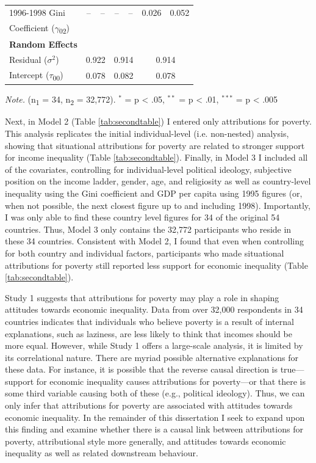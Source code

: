 \documentclass{sfuthesis}
\begin{document}
\begin{table}[h]
\begin{center}
\begin{tabular}{l c c c c c c}
      1996-1998 Gini & -- & -- & -- & -- & \multicolumn{1}{S}{0.026} & \multicolumn{1}{S}{0.052}\\
      Coefficient ($\gamma$\textsubscript{02})\\
      \textbf{Random Effects}\\
      Residual ($\sigma^2$) & \multicolumn{2}{S}{0.922} & \multicolumn{2}{S}{0.914} & \multicolumn{2}{S}{0.914}\\
      Intercept ($\tau$\textsubscript{00}) & \multicolumn{2}{S}{0.078} & \multicolumn{2}{S}{0.082} & \multicolumn{2}{S}{0.078}\\
      \hline
    \end{tabular}
  \end{center}
  \textit{Note.} (n\textsubscript{1} = 34, n\textsubscript{2} = 32,772). $^*$ = p < .05, $^{**}$ = p < .01, $^{***}$ = p < .005
\end{table}

Next, in Model 2 (Table \ref{tab:secondtable}) I entered only attributions for poverty. This analysis replicates the initial individual-level (i.e. non-nested) analysis, showing that situational attributions for poverty are related to stronger support for income inequality (Table \ref{tab:secondtable}). Finally, in Model 3 I included all of the covariates, controlling for individual-level political ideology, subjective position on the income ladder, gender, age, and religiosity as well as country-level inequality using the Gini coefficient and GDP per capita using 1995 figures (or, when not possible, the next closest figure up to and including 1998). Importantly, I was only able to find these country level figures for 34 of the original 54 countries. Thus, Model 3 only contains the 32,772 participants who reside in these 34 countries. Consistent with Model 2, I found that even when controlling for both country and individual factors, participants who made situational attributions for poverty still reported less support for economic inequality (Table \ref{tab:secondtable}).

Study 1 suggests that attributions for poverty may play a role in shaping attitudes towards economic inequality. Data from over 32,000 respondents in 34 countries indicates that individuals who believe poverty is a result of internal explanations, such as laziness, are less likely to think that incomes should be more equal. However, while Study 1 offers a large-scale analysis, it is limited by its correlational nature. There are myriad possible alternative explanations for these data. For instance, it is possible that the reverse causal direction is true—support for economic inequality causes attributions for poverty—or that there is some third variable causing both of these (e.g., political ideology). Thus, we can only infer that attributions for poverty are associated with attitudes towards economic inequality. In the remainder of this dissertation I seek to expand upon this finding and examine whether there is a causal link between attributions for poverty, attributional style more generally, and attitudes towards economic inequality as well as related downstream behaviour.
\end{document}

